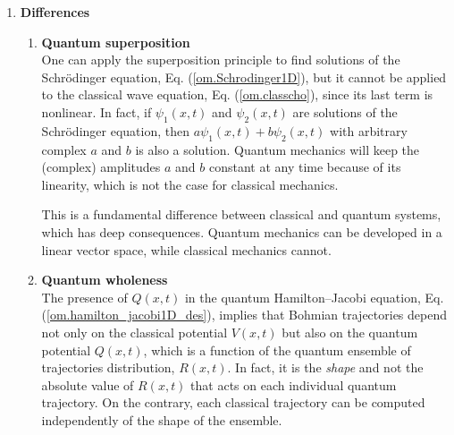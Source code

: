 \documentclass[onecolumn,nofootinbib, secnumarabic, amsmath, nobibnotes,12pt,aps,pra]{revtex4-1}
\newcommand{\eref}[1]{Eq. (\ref{#1})}
\begin{document}
\begin{enumerate}
\item \textbf{Differences}
\begin{enumerate}
\item \textbf{Quantum superposition} \\ One can apply the superposition principle to find solutions of the Schr\"odinger equation, \eref{om.Schrodinger1D}, but it cannot be applied to the classical wave equation, \eref{om.classcho}, since its last term is nonlinear. In fact, if $\psi_1(x,t)$ and $\psi_2(x,t)$ are solutions of the Schr\"odinger equation, then $a\psi_1(x,t) + b\psi_2(x,t)$ with arbitrary complex $a$ and $b$ is also a solution. Quantum mechanics will keep the (complex) amplitudes $a$ and $b$ constant at any time because of its linearity, which is not the case for classical mechanics.

{\quad}This is a fundamental difference between classical and quantum systems, which has deep consequences. Quantum mechanics can be developed in a linear vector space, while classical mechanics cannot.

\item \textbf{Quantum wholeness} \\ The presence of $Q(x,t)$ in the quantum Hamilton--Jacobi equation, \eref{om.hamilton_jacobi1D_des}, implies that Bohmian trajectories depend not only on the classical potential $V(x,t)$ but also on the quantum potential $Q(x,t)$, which is a function of the quantum ensemble of trajectories distribution, $R(x,t)$. In fact, it is the \textit{shape} and not the absolute value of $R(x,t)$ that acts on each individual quantum trajectory. On the contrary, each classical trajectory can be computed independently of the shape of the ensemble.


\end{enumerate}
\end{enumerate}
\end{document}
